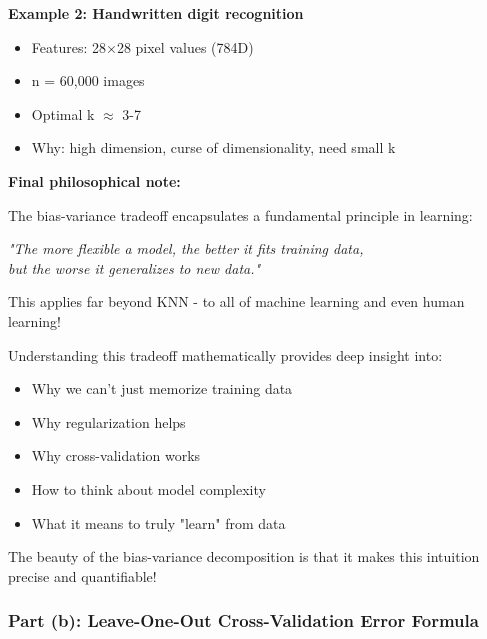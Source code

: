 \documentclass[12pt]{article}
\begin{document}
\begin{explanation}
\textbf{Example 2: Handwritten digit recognition}

\begin{itemize}
    \item Features: 28×28 pixel values (784D)
    \item n = 60,000 images
    \item Optimal k $\approx$ 3-7
    \item Why: high dimension, curse of dimensionality, need small k
\end{itemize}

\textbf{Final philosophical note:}

The bias-variance tradeoff encapsulates a fundamental principle in learning:

\begin{center}
\textit{"The more flexible a model, the better it fits training data, \\
but the worse it generalizes to new data."}
\end{center}

This applies far beyond KNN - to all of machine learning and even human learning!

Understanding this tradeoff mathematically provides deep insight into:
\begin{itemize}
    \item Why we can't just memorize training data
    \item Why regularization helps
    \item Why cross-validation works
    \item How to think about model complexity
    \item What it means to truly "learn" from data
\end{itemize}

The beauty of the bias-variance decomposition is that it makes this intuition precise and quantifiable!
\end{explanation}

\subsubsection{Part (b): Leave-One-Out Cross-Validation Error Formula}
\end{document}
